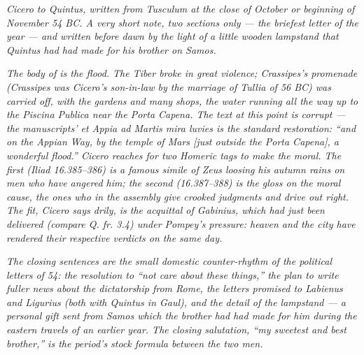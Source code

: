 
\textit{Cicero to Quintus, written from Tusculum at the close
of October or beginning of November 54 BC. A very short note,
two sections only --- the briefest letter of the year --- and
written before dawn by the light of a little wooden lampstand
that Quintus had had made for his brother on Samos.}

\textit{The body of  is the flood. The Tiber
broke in great violence; Crassipes's promenade (Crassipes was
Cicero's son-in-law by the marriage of Tullia of 56 BC) was
carried off, with the gardens and many shops, the water
running all the way up to the Piscina Publica near the Porta
Capena. The text at this point is corrupt --- the manuscripts'
\textit{et Appia ad Martis mira luvies} is the standard
restoration: ``and on the Appian Way, by the temple of Mars
[just outside the Porta Capena], a wonderful flood.'' Cicero
reaches for two Homeric tags to make the moral. The first
(\textit{Iliad} 16.385--386) is a famous simile of Zeus
loosing his autumn rains on men who have angered him; the
second (16.387--388) is the gloss on the moral cause, the
ones who in the assembly give crooked judgments and drive
out right. The fit, Cicero says drily, is the acquittal of
Gabinius, which had just been delivered (compare Q. fr. 3.4)
under Pompey's pressure: heaven and the city have rendered
their respective verdicts on the same day.}

\textit{The closing sentences are the small domestic
counter-rhythm of the political letters of 54: the resolution
to ``not care about these things,'' the plan to write fuller
news about the dictatorship from Rome, the letters promised to
Labienus and Ligurius (both with Quintus in Gaul), and the
detail of the lampstand --- a personal gift sent from Samos
which the brother had had made for him during the eastern
travels of an earlier year. The closing salutation, ``my
sweetest and best brother,'' is the period's stock formula
between the two men.}
